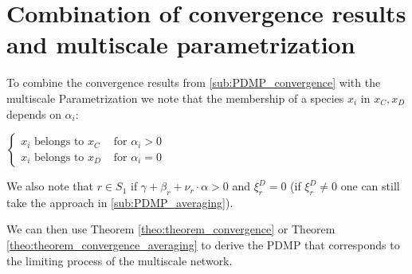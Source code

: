 \documentclass[english]{article}
\begin{document}
\section{Combination of convergence results and multiscale
	parametrization}

To combine the convergence results from \ref{sub:PDMP_convergence}
with the multiscale Parametrization we note that the membership of
a species $x_{i}$ in $x_{C}, x_{D}$ depends on $\alpha_{i}$:

$\begin{cases}
	x_{i} \mbox{ belongs to } x_{C} & \mbox{ for } \alpha_{i} > 0 \\
	x_{i} \mbox{ belongs to } x_{D} & \mbox{ for } \alpha_{i} = 0
\end{cases}$

We also note that $r \in S_{1}$ if
$\gamma + \beta_{r} + \nu_{r} \cdot \alpha > 0$
and $\xi_{r}^{D} = 0$ (if $\xi_{r}^{D} \neq 0$ one can still take the
approach in \ref{sub:PDMP_averaging}).

We can then use Theorem \ref{theo:theorem_convergence} or Theorem
\ref{theo:theorem_convergence_averaging} to derive the PDMP that
corresponds to the limiting process of the multiscale network.



\end{document}
